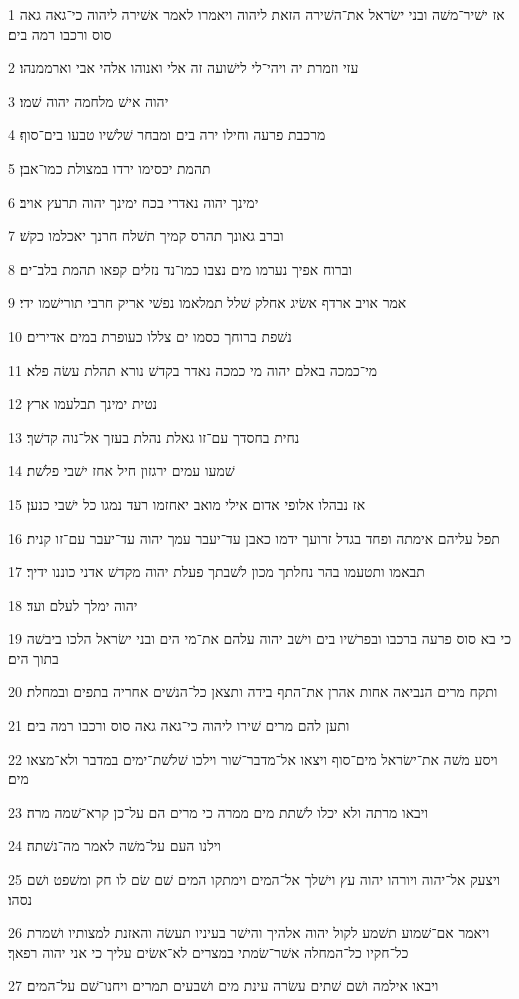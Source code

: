 \par 1 אז ישׁיר־משׁה ובני ישׂראל את־השׁירה הזאת ליהוה ויאמרו לאמר אשׁירה ליהוה כי־גאה גאה סוס ורכבו רמה בים׃
\par 2 עזי וזמרת יה ויהי־לי לישׁועה זה אלי ואנוהו אלהי אבי וארממנהו׃
\par 3 יהוה אישׁ מלחמה יהוה שׁמו׃
\par 4 מרכבת פרעה וחילו ירה בים ומבחר שׁלשׁיו טבעו בים־סוף׃
\par 5 תהמת יכסימו ירדו במצולת כמו־אבן׃
\par 6 ימינך יהוה נאדרי בכח ימינך יהוה תרעץ אויב׃
\par 7 וברב גאונך תהרס קמיך תשׁלח חרנך יאכלמו כקשׁ׃
\par 8 וברוח אפיך נערמו מים נצבו כמו־נד נזלים קפאו תהמת בלב־ים׃
\par 9 אמר אויב ארדף אשׂיג אחלק שׁלל תמלאמו נפשׁי אריק חרבי תורישׁמו ידי׃
\par 10 נשׁפת ברוחך כסמו ים צללו כעופרת במים אדירים׃
\par 11 מי־כמכה באלם יהוה מי כמכה נאדר בקדשׁ נורא תהלת עשׂה פלא׃
\par 12 נטית ימינך תבלעמו ארץ׃
\par 13 נחית בחסדך עם־זו גאלת נהלת בעזך אל־נוה קדשׁך׃
\par 14 שׁמעו עמים ירגזון חיל אחז ישׁבי פלשׁת׃
\par 15 אז נבהלו אלופי אדום אילי מואב יאחזמו רעד נמגו כל ישׁבי כנען׃
\par 16 תפל עליהם אימתה ופחד בגדל זרועך ידמו כאבן עד־יעבר עמך יהוה עד־יעבר עם־זו קנית׃
\par 17 תבאמו ותטעמו בהר נחלתך מכון לשׁבתך פעלת יהוה מקדשׁ אדני כוננו ידיך׃
\par 18 יהוה ימלך לעלם ועד׃
\par 19 כי בא סוס פרעה ברכבו ובפרשׁיו בים וישׁב יהוה עלהם את־מי הים ובני ישׂראל הלכו ביבשׁה בתוך הים׃
\par 20 ותקח מרים הנביאה אחות אהרן את־התף בידה ותצאן כל־הנשׁים אחריה בתפים ובמחלת׃
\par 21 ותען להם מרים שׁירו ליהוה כי־גאה גאה סוס ורכבו רמה בים׃
\par 22 ויסע משׁה את־ישׂראל מים־סוף ויצאו אל־מדבר־שׁור וילכו שׁלשׁת־ימים במדבר ולא־מצאו מים׃
\par 23 ויבאו מרתה ולא יכלו לשׁתת מים ממרה כי מרים הם על־כן קרא־שׁמה מרה׃
\par 24 וילנו העם על־משׁה לאמר מה־נשׁתה׃
\par 25 ויצעק אל־יהוה ויורהו יהוה עץ וישׁלך אל־המים וימתקו המים שׁם שׂם לו חק ומשׁפט ושׁם נסהו׃
\par 26 ויאמר אם־שׁמוע תשׁמע לקול יהוה אלהיך והישׁר בעיניו תעשׂה והאזנת למצותיו ושׁמרת כל־חקיו כל־המחלה אשׁר־שׂמתי במצרים לא־אשׂים עליך כי אני יהוה רפאך׃
\par 27 ויבאו אילמה ושׁם שׁתים עשׂרה עינת מים ושׁבעים תמרים ויחנו־שׁם על־המים׃

